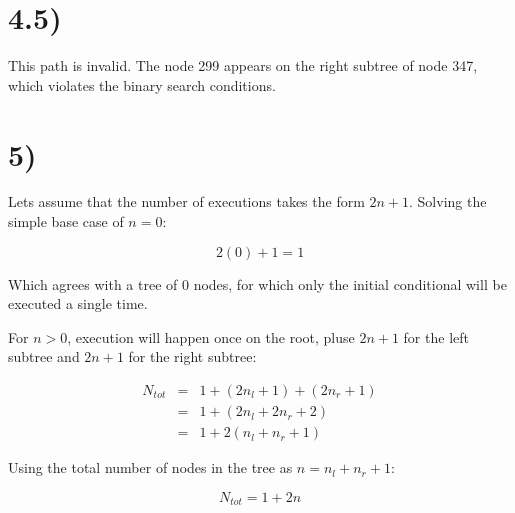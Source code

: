 \documentclass[a4paper,11pt]{article}
\begin{document}
\section*{4.5)} 
This path is invalid.  The node 299 appears on the right subtree of node 347, which violates the binary search conditions.


\section*{5)}
Lets assume that the number of executions takes the form $2n + 1$.  Solving the simple base case of $n=0$:

\begin{equation}
2(0) + 1 = 1
\end{equation}

Which agrees with a tree of 0 nodes, for which only the initial conditional will be executed a single time.

For $n > 0$, execution will happen once on the root, pluse $2n+1$ for the left subtree and $2n+1$ for the right subtree:

\begin{eqnarray}
N_{tot} &=& 1 + (2n_l + 1) + (2n_r + 1) \\ 
&=& 1 + (2n_l + 2n_r + 2) \\
&=& 1 + 2(n_l + n_r + 1) 
\end{eqnarray}

Using the total number of nodes in the tree as $n = n_l + n_r + 1$:

\begin{equation}
N_{tot} = 1 + 2n
\end{equation}

\end{document}
